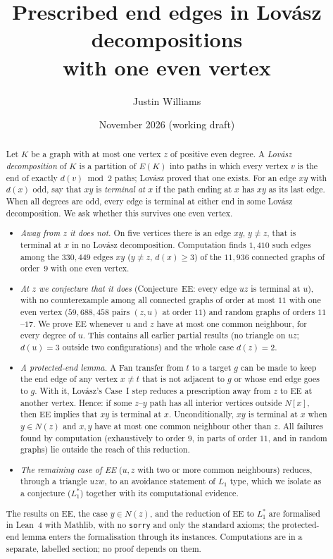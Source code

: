 \documentclass[11pt]{amsart}
\title[Prescribed end edges]{Prescribed end edges in Lov\'asz decompositions\\ with one even vertex}
\author{Justin Williams}
\date{November 2026 (working draft)}
\theoremstyle{definition}
\begin{document}
\begin{abstract}
Let $K$ be a graph with at most one vertex $z$ of positive even degree. A \emph{Lov\'asz
decomposition} of $K$ is a partition of $E(K)$ into paths in which every vertex $v$ is the end of
exactly $d(v)\bmod 2$ paths; Lov\'asz proved that one exists. For an edge $xy$ with $d(x)$ odd, say
that $xy$ is \emph{terminal at $x$} if the path ending at $x$ has $xy$ as its last edge. When all
degrees are odd, every edge is terminal at either end in some Lov\'asz decomposition. We ask
whether this survives one even vertex.

\begin{itemize}
\item \emph{Away from $z$ it does not.} On five vertices there is an edge $xy$, $y\ne z$, that is
terminal at $x$ in no Lov\'asz decomposition. Computation finds $1{,}410$ such edges among the
$330{,}449$ edges $xy$ ($y\ne z$, $d(x)\ge3$) of the $11{,}936$ connected graphs of order~$9$ with one
even vertex.
\item \emph{At $z$ we conjecture that it does} (Conjecture~EE: every edge $uz$ is terminal at $u$),
with no counterexample among all connected graphs of order at most $11$ with one even vertex
($59{,}688{,}458$ pairs $(z,u)$ at order $11$) and random graphs of orders $11$--$17$. We prove EE whenever $u$ and $z$ have at most one
common neighbour, for every degree of $u$. This contains all earlier partial results (no triangle on
$uz$; $d(u)=3$ outside two configurations) and the whole case $d(z)=2$.
\item \emph{A protected-end lemma.} A Fan transfer from $t$ to a target $g$ can be made to keep the end
edge of any vertex $x\ne t$ that is not adjacent to $g$ or whose end edge goes to $g$. With it, Lov\'asz's
Case~I step reduces a prescription away from $z$ to EE at another vertex. Hence: if some $z$--$y$
path has all interior vertices outside $N[x]$, then EE implies that $xy$ is terminal at $x$.
Unconditionally, $xy$ is terminal at $x$ when $y\in N(z)$ and $x,y$ have at most one common
neighbour other than $z$. All failures found by computation (exhaustively to order $9$, in parts of
order $11$, and in random graphs) lie outside the reach of this reduction.
\item \emph{The remaining case of EE} ($u,z$ with two or more common neighbours) reduces, through a
triangle $uzw$, to an avoidance statement of $L_1$ type, which we isolate as a conjecture ($L_1^*$)
together with its computational evidence.
\end{itemize}
The results on EE, the case $y\in N(z)$, and the reduction of EE to $L_1^*$ are formalised in Lean~4
with Mathlib, with no \texttt{sorry} and only the standard axioms; the protected-end lemma enters the
formalisation through its instances. Computations are in a separate, labelled section; no proof depends on them.
\end{abstract}
\maketitle
\end{document}
